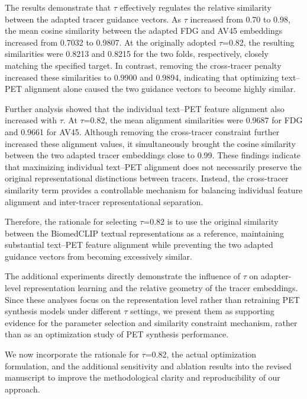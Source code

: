 {The results demonstrate that \ensuremath{\tau} effectively regulates the relative similarity between the adapted tracer guidance vectors. As \ensuremath{\tau} increased from 0.70 to 0.98, the mean cosine similarity between the adapted FDG and AV45 embeddings increased from 0.7032 to 0.9807. At the originally adopted \ensuremath{\tau}=0.82, the resulting similarities were 0.8213 and 0.8215 for the two folds, respectively, closely matching the specified target. In contrast, removing the cross-tracer penalty increased these similarities to 0.9900 and 0.9894, indicating that optimizing text–PET alignment alone caused the two guidance vectors to become highly similar.

Further analysis showed that the individual text–PET feature alignment also increased with \ensuremath{\tau}. At \ensuremath{\tau}=0.82, the mean alignment similarities were 0.9687 for FDG and 0.9661 for AV45. Although removing the cross-tracer constraint further increased these alignment values, it simultaneously brought the cosine similarity between the two adapted tracer embeddings close to 0.99. These findings indicate that maximizing individual text–PET alignment does not necessarily preserve the original representational distinctions between tracers. Instead, the cross-tracer similarity term provides a controllable mechanism for balancing individual feature alignment and inter-tracer representational separation.

Therefore, the rationale for selecting \ensuremath{\tau}=0.82 is to use the original similarity between the BiomedCLIP textual representations as a reference, maintaining substantial text–PET feature alignment while preventing the two adapted guidance vectors from becoming excessively similar.

The additional experiments directly demonstrate the influence of \ensuremath{\tau} on adapter-level representation learning and the relative geometry of the tracer embeddings. Since these analyses focus on the representation level rather than retraining PET synthesis models under different \ensuremath{\tau} settings, we present them as supporting evidence for the parameter selection and similarity constraint mechanism, rather than as an optimization study of PET synthesis performance.

We now incorporate the rationale for \ensuremath{\tau}=0.82, the actual optimization formulation, and the additional sensitivity and ablation results into the revised manuscript to improve the methodological clarity and reproducibility of our approach.}

